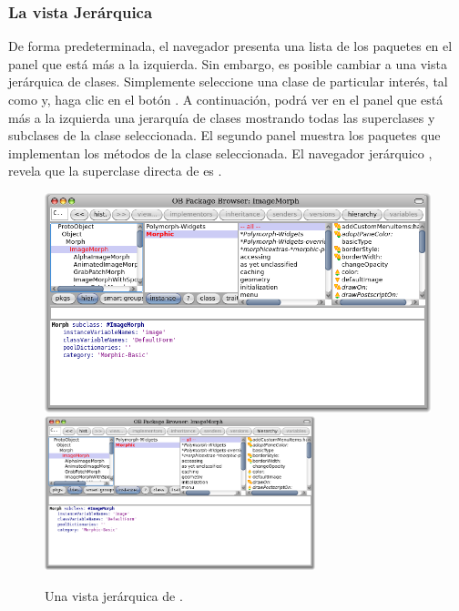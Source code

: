 \documentclass[spanish,a4paper,10pt,twoside]{book}
\begin{document}
\subsubsection{La vista Jer\'arquica}

De forma predeterminada, el navegador presenta una lista de los paquetes en el panel que est\'a m\'as a la izquierda.
Sin embargo, es posible cambiar a una vista jer\'arquica de clases.
Simplemente seleccione una clase de particular inter\'es, tal como   y, haga clic en el bot\'on .
A continuaci\'on, podr\'a ver en el panel que est\'a m\'as a la izquierda una jerarqu\'ia de clases mostrando todas las superclases y subclases de la clase seleccionada.
El segundo panel muestra los paquetes que implementan los m\'etodos de la clase seleccionada.
El navegador jer\'arquico , revela que la superclase directa de  es .

\begin{figure}[btp]
	\begin{center}
	\ifluluelse
		{\includegraphics[width=\textwidth]{hierarchyBrowser}}
		{\includegraphics[width=0.7\textwidth]{hierarchyBrowser}}
	\end{center}
	\caption{Una vista jer\'arquica de .}
\end{figure}
\end{document}

